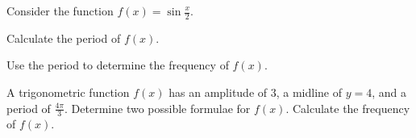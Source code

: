 \documentclass[a4paper,oneside,12pt]{article}
\begin{document}
\begin{exercise}
Consider the function $f(x) = \sin \frac{x}{2}$.
\begin{packedenum}
\item\label{subeg:trigonometric:sin_half_period}
  Calculate the period of $f(x)$.

\item\label{subeg:trigonometric:sin_half_frequency}
  Use the period to determine the frequency of $f(x)$.
\end{packedenum}
\end{exercise}


\begin{exercise}
A trigonometric function $f(x)$ has an amplitude of $3$, a midline of
$y = 4$, and a period of $\frac{4\pi}{3}$.  Determine two possible
formulae for $f(x)$.  Calculate the frequency of $f(x)$.
\end{exercise}
\end{document}
